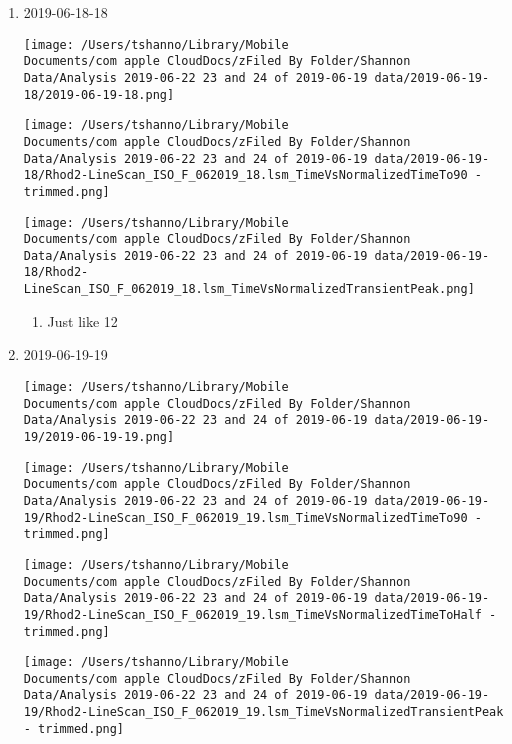 \documentclass[11pt]{article}
\begin{document}
\begin{enumerate}
\begin{enumerate}
\item 2019-06-18-18
\label{sec:org5fab30f}
\begin{center}
\texttt{[image: /Users/tshanno/Library/Mobile Documents/com~apple~CloudDocs/zFiled By Folder/Shannon Data/Analysis 2019-06-22 23 and 24 of 2019-06-19 data/2019-06-19-18/2019-06-19-18.png]}
\end{center}
\begin{center}
\texttt{[image: /Users/tshanno/Library/Mobile Documents/com~apple~CloudDocs/zFiled By Folder/Shannon Data/Analysis 2019-06-22 23 and 24 of 2019-06-19 data/2019-06-19-18/Rhod2-LineScan\_ISO\_F\_062019\_18.lsm\_TimeVsNormalizedTimeTo90 - trimmed.png]}
\end{center}
\begin{center}
\texttt{[image: /Users/tshanno/Library/Mobile Documents/com~apple~CloudDocs/zFiled By Folder/Shannon Data/Analysis 2019-06-22 23 and 24 of 2019-06-19 data/2019-06-19-18/Rhod2-LineScan\_ISO\_F\_062019\_18.lsm\_TimeVsNormalizedTransientPeak.png]}
\end{center}
\begin{enumerate}
\item Just like 12
\label{sec:orgb8b0765}
\end{enumerate}
\item 2019-06-19-19
\label{sec:orge5bc484}
\begin{center}
\texttt{[image: /Users/tshanno/Library/Mobile Documents/com~apple~CloudDocs/zFiled By Folder/Shannon Data/Analysis 2019-06-22 23 and 24 of 2019-06-19 data/2019-06-19-19/2019-06-19-19.png]}
\end{center}
\begin{center}
\texttt{[image: /Users/tshanno/Library/Mobile Documents/com~apple~CloudDocs/zFiled By Folder/Shannon Data/Analysis 2019-06-22 23 and 24 of 2019-06-19 data/2019-06-19-19/Rhod2-LineScan\_ISO\_F\_062019\_19.lsm\_TimeVsNormalizedTimeTo90 - trimmed.png]}
\end{center}
\begin{center}
\texttt{[image: /Users/tshanno/Library/Mobile Documents/com~apple~CloudDocs/zFiled By Folder/Shannon Data/Analysis 2019-06-22 23 and 24 of 2019-06-19 data/2019-06-19-19/Rhod2-LineScan\_ISO\_F\_062019\_19.lsm\_TimeVsNormalizedTimeToHalf - trimmed.png]}
\end{center}
\begin{center}
\texttt{[image: /Users/tshanno/Library/Mobile Documents/com~apple~CloudDocs/zFiled By Folder/Shannon Data/Analysis 2019-06-22 23 and 24 of 2019-06-19 data/2019-06-19-19/Rhod2-LineScan\_ISO\_F\_062019\_19.lsm\_TimeVsNormalizedTransientPeak - trimmed.png]}

\end{center}
\end{enumerate}
\end{enumerate}
\end{document}
